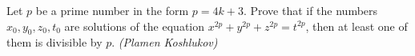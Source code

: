 Let $p$ be a prime number in the form $p=4k+3$. Prove that if the numbers $x_0,y_0,z_0,t_0$ are solutions of the equation $x^{2p}+y^{2p}+z^{2p}=t^{2p}$, then at least one of them is divisible by $p$. \textit{(Plamen Koshlukov)}